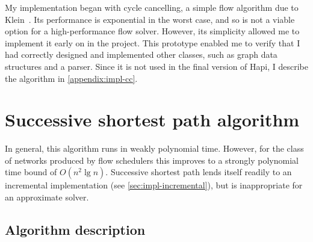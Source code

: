 
My implementation began with cycle cancelling, a simple flow algorithm due to Klein~\cite{Klein:1967}. Its performance is exponential in the worst case, and so is not a viable option for a high-performance flow solver. However, its simplicity allowed me to implement it early on in the project. This prototype enabled me to verify that I had correctly designed and implemented other classes, such as graph data structures and a parser. Since it is not used in the final version of Hapi, I describe the algorithm in \cref{appendix:impl-cc}.

\section{Successive shortest path algorithm} \label{sec:impl-ssp}


In general, this algorithm runs in weakly polynomial time. However, for the class of networks produced by flow schedulers this improves to a strongly polynomial time bound of $O(n^2 \lg n)$. Successive shortest path lends itself readily to an incremental implementation (see \cref{sec:impl-incremental}), but is inappropriate for an approximate solver.

\subsection{Algorithm description}

